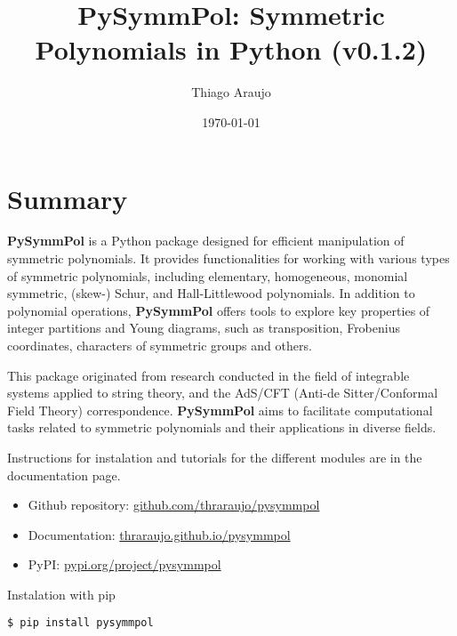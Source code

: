\documentclass[a4paper,10pt]{amsart}
\begin{document}
\title[PySymmPol]{PySymmPol: Symmetric Polynomials in Python (v0.1.2)}

\author{Thiago Araujo}

\address{\noindent 
Instituto de Física Teórica, UNESP-Universidade Estadual Paulista,
R. Dr. Bento T. Ferraz 271, Bl. II, Sao Paulo 01140-070, SP, Brazil\\
\&
Instituto de Física, Universidade de S\~ao Paulo,
Rua do Matão Travessa 1371, 05508-090 São Paulo, SP. Brazil
}


\date{\today}

\maketitle

\setcounter{tocdepth}{1}
\tableofcontents


\section{Summary}

\textbf{PySymmPol} is a Python package designed for efficient manipulation of
symmetric polynomials. It provides functionalities for working with
various types of symmetric polynomials, including elementary,
homogeneous, monomial symmetric, (skew-) Schur, and Hall-Littlewood
polynomials. In addition to polynomial operations, \textbf{PySymmPol} offers
tools to explore key properties of integer partitions and Young
diagrams, such as transposition, Frobenius coordinates, characters of
symmetric groups and others. 

This package originated from research conducted in the field of
integrable systems applied to string theory, and the AdS/CFT (Anti-de
Sitter/Conformal Field Theory) correspondence. \textbf{PySymmPol} aims to
facilitate computational tasks related to symmetric polynomials and
their applications in diverse fields.

Instructions for instalation and tutorials for the different modules
are in the documentation page. 
\begin{itemize}
    \item Github repository: \href{https://github.com/thraraujo/pysymmpol}{github.com/thraraujo/pysymmpol}
    \item Documentation: \href{https://thraraujo.github.io/pysymmpol}{thraraujo.github.io/pysymmpol}
    \item PyPI: \href{https://pypi.org/project/pysymmpol}{pypi.org/project/pysymmpol}
\end{itemize}
Instalation with pip 
\begin{lstlisting}[language=Python]
  $ pip install pysymmpol
\end{lstlisting}
\end{document}
